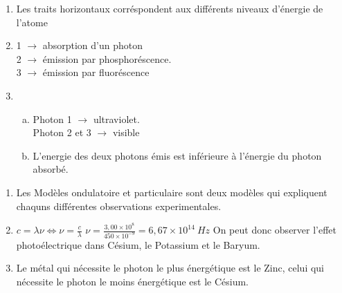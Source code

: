 \documentclass[12pt, a4paper]{article}
\begin{document}
    \begin{Exercise}[number={31}]
        \begin{enumerate}[1.]
            \item	Les traits horizontaux corréspondent aux différents niveaux d'énergie de l'atome
            \item   { \large\textcircled{\small{1}} }$\rightarrow$ absorption d'un photon \\ { \large\textcircled{\small{2}} }$\rightarrow$ émission par phosphoréscence. \\ { \large\textcircled{\small{3}} }$\rightarrow$ émission par fluoréscence
            \item   \begin{enumerate}[a.]
                        \item	Photon { \large\textcircled{\small{1}} }$\rightarrow$ ultraviolet. \\ Photon { \large\textcircled{\small{2}} } et { \large\textcircled{\small{3}} }$\rightarrow$ visible
                        \item   L'energie des deux photons émis est inférieure à l'énergie du photon absorbé.
                    \end{enumerate}
        \end{enumerate}
    \end{Exercise}

    \begin{Exercise}[number={32}]
        \begin{enumerate}[1.]
            \item	Les Modèles ondulatoire et particulaire sont deux modèles qui expliquent chaquns différentes observations experimentales.
            \item   $c=\lambda\nu\iff\nu=\frac{c}{\lambda}$ \quad $\nu=\frac{3{,}00\times 10^{8}}{450\times 10^{-9}}=6{,}67\times 10^{14}\ \si{Hz}$ \smallbreak On peut donc observer l'effet photoélectrique dans Césium, le Potassium et le Baryum.
            \item   Le métal qui nécessite le photon le plus énergétique est le Zinc, celui qui nécessite le photon le moins énergétique est le Césium.
        \end{enumerate}
    \end{Exercise}
\end{document}
